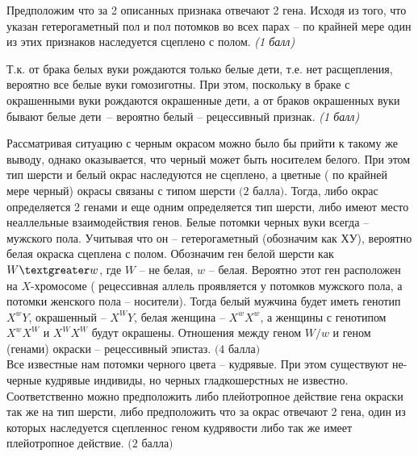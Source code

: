 \solutionSection Предположим что за 2 описанных признака отвечают 2 гена. Исходя из того, что указан гетерогаметный пол и пол потомков во всех парах – по крайней мере один из этих признаков наследуется сцеплено с полом. \textit{(1 балл)}

Т.к. от брака белых вуки рождаются только белые дети, т.е. нет расщепления, вероятно все белые вуки гомозиготны. 
При этом, поскольку в браке с окрашенными вуки рождаются окрашенные дети, а от браков окрашенных вуки бывают белые дети~– вероятно белый – рецессивный признак. \textit{(1 балл)}

Рассматривая ситуацию с черным окрасом можно было бы прийти к такому же выводу, однако оказывается, что черный может быть носителем белого. При этом тип шерсти и белый окрас наследуются не сцеплено, а цветные ( по крайней мере черный) окрасы связаны с типом шерсти $\textit{(2 балла)}$. Тогда, либо окрас определяется 2 генами и еще одним определяется тип шерсти, либо имеют место неаллельные взаимодействия генов. Белые потомки черных вуки всегда – мужского пола. Учитывая что он – гетерогаметный (обозначим как $ХУ$), вероятно белая окраска сцеплена с полом. Обозначим ген белой шерсти как $W\textgreater w$, где $W$ – не белая, $w$ – белая. Вероятно этот ген расположен на $X$-хромосоме ( рецессивная аллель проявляется у потомков мужского пола, а потомки женского пола – носители). Тогда белый мужчина будет иметь генотип $X^wY$, окрашенный – $X^WY$, белая женщина –  $X^wX^w$, а женщины с генотипом $X^wX^W$ и $X^WX^W$ будут окрашены. Отношения между геном $W/w$ и геном (генами) окраски – рецессивный эпистаз. $\textit{(4 балла)}$\\

Все известные нам потомки черного цвета – кудрявые. При этом существуют не-черные кудрявые индивиды, но черных гладкошерстных не известно. Соответственно можно предположить либо плейотропное действие гена окраски так же на тип шерсти, либо предположить что за окрас отвечают 2 гена, один из которых наследуется сцепленнос геном кудрявости либо так же имеет плейотропное действие. $\textit{(2 балла)}$

